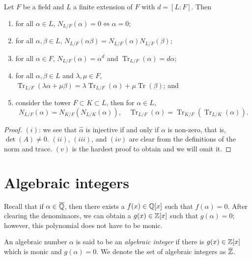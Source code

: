 \begin{proposition}
	Let $F$ be a field and $L$ a finite extension of $F$
	with $d = [L:F]$.
	Then
	\begin{enumerate}
		\item for all $\alpha \in L$,
			$N_{L/F}(\alpha) = 0 \iff \alpha = 0$;

		\item for all $\alpha, \beta \in L$,
			$N_{L/F}(\alpha\beta) = N_{L/F}(\alpha) N_{L/F}(\beta)$;

		\item for all $\alpha \in F$,
			$N_{L/F}(\alpha) = \alpha^d$ and
			$\operatorname{Tr}_{L/F}(\alpha) = d\alpha$;

		\item for all $\alpha, \beta \in L$ and $\lambda, \mu \in F$,
			$\operatorname{Tr}_{L/F}(\lambda\alpha + \mu\beta)
			= \lambda \operatorname{Tr}_{L/F}(\alpha)
			+ \mu \operatorname{Tr}(\beta)$; and

		\item consider the tower $F \subset K \subset L$, 
			then for $\alpha \in L$,
			\[
				N_{L/F}(\alpha) = N_{K/F} \left( N_{L/K}(\alpha) \right),
				\quad
				\operatorname{Tr}_{L/F}(\alpha)
				= \operatorname{Tr}_{K/F} \left( 
					\operatorname{Tr}_{L/K}(\alpha)
				\right).
			\]
	\end{enumerate}
\end{proposition}

\begin{proof}
	$(i)$: we see that $\hat\alpha$ is injective if and only if $\alpha$ is 
	non-zero, that is, $\det(A) \neq 0$.
	$(ii)$, $(iii)$, and $(iv)$ are clear from the definitions of the
	norm and trace.
	$(v)$ is the hardest proof to obtain and we will omit it.
\end{proof}

\section{Algebraic integers}

Recall that if $\alpha \in \overline{\mathbb{Q}}$, then there exists a
$f(x) \in \mathbb{Q}[x]$ such that $f(\alpha) = 0$.
After clearing the denominaors, we can obtain a $g(x) \in \mathbb{Z}[x]$
such that $g(\alpha) = 0$; however,
this polynomial does not have to be monic.

\begin{definition}
	An algebraic number $\alpha$ is said to be an \emph{algebraic integer} 
	if there is $g(x) \in \mathbb{Z}[x]$ which is monic and $g(\alpha) = 0$.
	We denote the set of algebraic integers as $\overline{\mathbb{Z}}$.
\end{definition}

